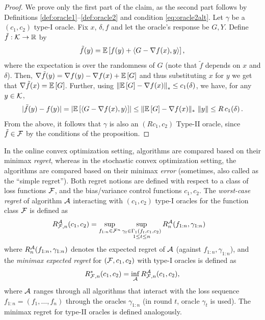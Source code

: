 \begin{proof}
We prove only the first part of the claim, as the second part follows by Definitions \ref{def:oracle1}--\ref{def:oracle2} and condition \eqref{eq:oracle2alt}.
Let $\gamma$ be  a $(c_1,c_2)$ type-I oracle. Fix $x$, $\delta,f$ and let the oracle's response be $G,Y$. 
Define $\tilde{f}:\mathcal{K} \to \mathbb{R}$ by
\[\tilde{f}(y) =\mathbb{E}\left[ f(y)+ \langle G-\nabla f(x) , y \rangle\right],\]
where the expectation is over the randomness of $G$ (note that $\tilde{f}$ depends on $x$ and $\delta$).
Then, $\nabla \tilde{f}(y) =  \nabla f(y)-\nabla f(x) + \mathbb{E}\left[G\right]$
and thus substituting $x$ for $y$ we get that $\nabla \tilde{f}(x) = \mathbb{E}\left[G\right]$.
Further, 
using $\left\| \mathbb{E}\left[G\right]  - \nabla f(x)  \right\|_* \le c_1(\delta) $,
we have, for any $y \in \mathcal{K}$,
\begin{align*}
|\tilde{f}(y)-f(y)|
=
\left| \mathbb{E}\left[\langle G-\nabla f(x), y \rangle\right]\right|
 \le \large\|\mathbb{E}\left[G\right]-\nabla f(x)\large\|_* \, \left\|y\right\|
 \le  R\,c_1(\delta)\,.
\end{align*}
From the above, it follows that $\gamma$ is also an $(Rc_1,c_2)$ Type-II oracle, since $\tilde{f}\in\mathcal{F}$ by the conditions of the proposition. 
\end{proof}

In the online convex optimization setting,
algorithms are compared based on their minimax \emph{regret}, 
whereas in the stochastic convex optimization setting, the algorithms are compared based on their
 minimax \emph{error}
 (sometimes, also called as the ``simple regret'').
Both regret notions are defined with respect to a class of loss functions $\mathcal{F}$, and the bias/variance control functions $c_1,c_2$.
The \emph{worst-case regret} of algorithm $\mathcal{A}$ interacting with $(c_1,c_2)$ type-I oracles for the function class $\mathcal{F}$ is
defined as
\begin{align*}
R_{\mathcal{F},n}^{\mathcal{A}}(c_1,c_2)
&=  \sup_{f_{1:n}\in \mathcal{F}^n}
	\sup_{\substack{\gamma_t \in \Gamma_1(f_t,c_1,c_2)\\1\le t \le n
	}} R_n^{\mathcal{A}}(f_{1:n},\gamma_{1:n})
\end{align*}
where $R_n^{\mathcal{A}}(f_{1:n},\gamma_{1:n})$ denotes the expected regret of $\mathcal{A}$ (against $f_{1:n},\gamma_{1:n}$), and
the \emph{minimax expected regret} for $(\mathcal{F},c_1,c_2)$ with type-I oracles is defined as
\[
R_{\mathcal{F},n}^*(c_1,c_2) = \inf_{\mathcal{A}} R_{\mathcal{F},n}^{\mathcal{A}}(c_1,c_2),
\]
where $\mathcal{A}$ ranges through all algorithms that interact with the loss sequence  $f_{1:n}= (f_1,\dots,f_n)$
through the oracles $\gamma_{1:n}$ (in round $t$, oracle $\gamma_t$ is used).
The minimax regret for type-II oracles is defined analogously.


